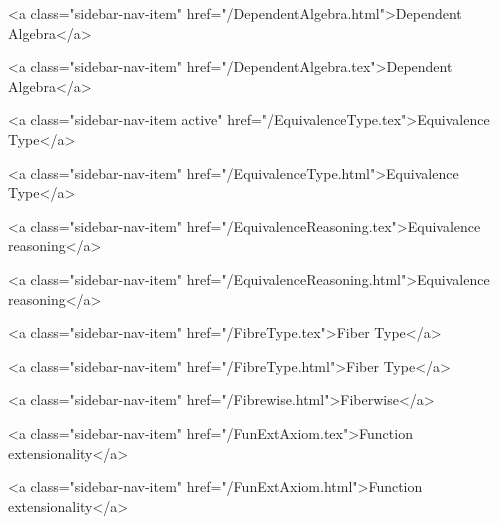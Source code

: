       
    
      
        
          <a class="sidebar-nav-item" href="/DependentAlgebra.html">Dependent Algebra</a>
        
      
    
      
        
          <a class="sidebar-nav-item" href="/DependentAlgebra.tex">Dependent Algebra</a>
        
      
    
      
        
          <a class="sidebar-nav-item active" href="/EquivalenceType.tex">Equivalence Type</a>
        
      
    
      
        
          <a class="sidebar-nav-item" href="/EquivalenceType.html">Equivalence Type</a>
        
      
    
      
        
          <a class="sidebar-nav-item" href="/EquivalenceReasoning.tex">Equivalence reasoning</a>
        
      
    
      
        
          <a class="sidebar-nav-item" href="/EquivalenceReasoning.html">Equivalence reasoning</a>
        
      
    
      
        
          <a class="sidebar-nav-item" href="/FibreType.tex">Fiber Type</a>
        
      
    
      
        
          <a class="sidebar-nav-item" href="/FibreType.html">Fiber Type</a>
        
      
    
      
        
          <a class="sidebar-nav-item" href="/Fibrewise.html">Fiberwise</a>
        
      
    
      
        
          <a class="sidebar-nav-item" href="/FunExtAxiom.tex">Function extensionality</a>
        
      
    
      
        
          <a class="sidebar-nav-item" href="/FunExtAxiom.html">Function extensionality</a>
        
